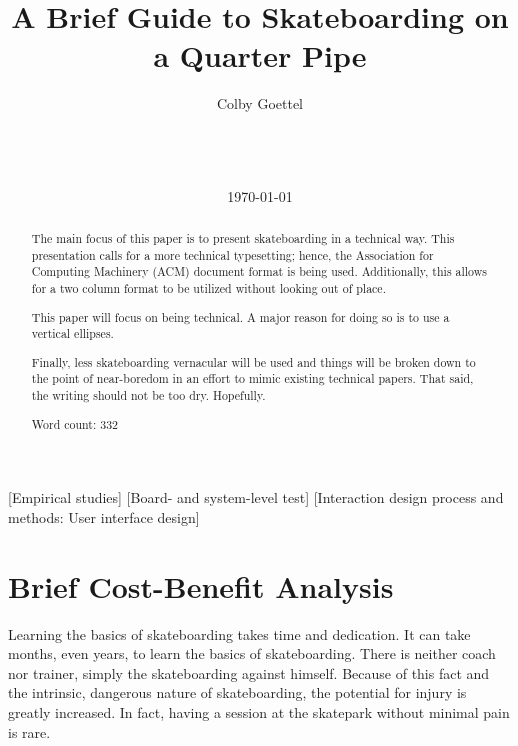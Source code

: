 \documentclass{acm_proc_article-sp}
\begin{document}
\title{A Brief Guide to Skateboarding on a Quarter Pipe}

\author{
\alignauthor
    Colby Goettel\\
    \\
    \\
    \\
}
\date{\today}

\maketitle
\begin{abstract}
    The main focus of this paper is to present skateboarding in a technical way. This presentation calls for a more technical typesetting; hence, the Association for Computing Machinery (ACM) document format is being used. Additionally, this allows for a two column format to be utilized without looking out of place.
    
    This paper will focus on being technical. A major reason for doing so is to use a vertical ellipses.
    
    Finally, less skateboarding vernacular will be used and things will be broken down to the point of near-boredom in an effort to mimic existing technical papers. That said, the writing should not be too dry. Hopefully.
    
    Word count: 332
\end{abstract}

[Empirical studies]
[Board- and system-level test]
[Interaction design process and methods: User interface design]



\section{Brief Cost-Benefit Analysis}
Learning the basics of skateboarding takes time and dedication. It can take months, even years, to learn the basics of skateboarding. There is neither coach nor trainer, simply the skateboarding against himself. Because of this fact and the intrinsic, dangerous nature of skateboarding, the potential for injury is greatly increased. In fact, having a session at the skatepark without minimal pain is rare.
\end{document}

